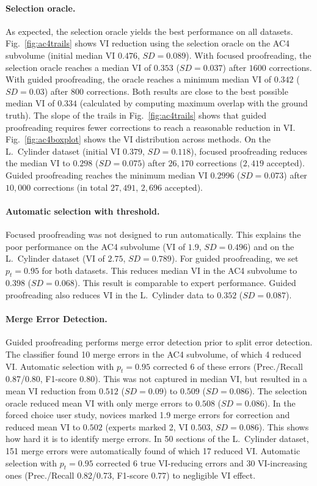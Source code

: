 \paragraph{Selection oracle.} As expected, the selection oracle yields the best performance on all datasets. Fig.~\ref{fig:ac4trails} shows VI reduction using the selection oracle on the AC4 subvolume (initial median VI $0.476$, $SD=0.089$). With focused proofreading, the selection oracle reaches a median VI of $0.353$ ($SD=0.037$) after $1600$ corrections. With guided proofreading, the oracle reaches a minimum median VI of $0.342$ ($SD=0.03$) after $800$ corrections. Both results are close to the best possible median VI of $0.334$ (calculated by computing maximum overlap with the ground truth). The slope of the trails in Fig.~\ref{fig:ac4trails} shows that guided proofreading requires fewer corrections to reach a reasonable reduction in VI. Fig.~\ref{fig:ac4boxplot} shows the VI distribution across methods. On the L.~Cylinder dataset (initial VI $0.379$, $SD=0.118$), focused proofreading reduces the median VI to $0.298$ ($SD=0.075$) after $26,170$ corrections ($2,419$ accepted). Guided proofreading reaches the minimum median VI $0.2996$ ($SD=0.073$) after $10,000$ corrections (in total $27,491$, $2,696$ accepted).

\paragraph{Automatic selection with threshold.} Focused proofreading was not designed to run automatically. This explains the poor performance on the AC4 subvolume (VI of $1.9$, $SD=0.496$) and on the L.~Cylinder dataset (VI of $2.75$, $SD=0.789$). For guided proofreading, we set $p_t=0.95$ for both datasets. This reduces median VI in the AC4 subvolume to $0.398$ ($SD=0.068$). This result is comparable to expert performance. Guided proofreading also reduces VI in the L.~Cylinder data to $0.352$ ($SD=0.087$).

\paragraph{Merge Error Detection.} Guided proofreading performs merge error detection prior to split error detection. The classifier found 10 merge errors in the AC4 subvolume, of which 4 reduced VI. Automatic selection with $p_t=0.95$ corrected 6 of these errors (Prec./Recall 0.87/0.80, F1-score 0.80). This was not captured in median VI, but resulted in a mean VI reduction from $0.512$ ($SD=0.09$) to $0.509$ ($SD=0.086$). The selection oracle reduced mean VI with only merge errors to $0.508$ ($SD=0.086$). In the forced choice user study, novices marked 1.9 merge errors for correction and reduced mean VI to $0.502$ (experts marked 2, VI $0.503$, $SD=0.086$). This shows how hard it is to identify merge errors. In 50 sections of the L.~Cylinder dataset, 151 merge errors were automatically found of which 17 reduced VI. Automatic selection with $p_t=0.95$ corrected 6 true VI-reducing errors and 30 VI-increasing ones (Prec./Recall 0.82/0.73, F1-score 0.77) to negligible VI effect. 

